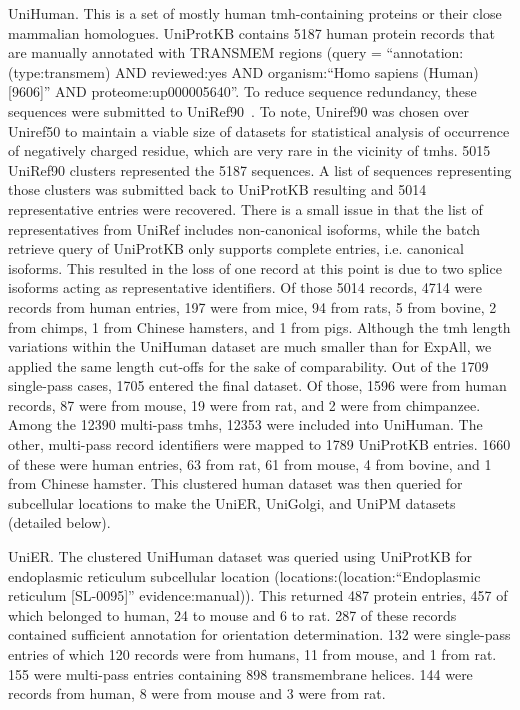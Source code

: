 UniHuman. This is a set of mostly human \gls{tmh}-containing proteins or their close mammalian homologues. UniProtKB contains 5187 human protein records that are manually annotated with TRANSMEM regions (query = ``annotation:(type:transmem) AND reviewed:yes AND organism:``Homo sapiens (Human) [9606]'' AND proteome:up000005640''. To reduce sequence redundancy, these sequences were submitted to UniRef90~\cite{Suzek2015}. To note, Uniref90 was chosen over Uniref50 to maintain a viable size of datasets for statistical analysis of occurrence of negatively charged residue, which are very rare in the vicinity of \gls{tmh}s. 5015 UniRef90 clusters represented the 5187 sequences. A list of sequences representing those clusters was submitted back to UniProtKB resulting and 5014 representative entries were recovered. There is a small issue in that the list of representatives from UniRef includes non-canonical isoforms, while the batch retrieve query of UniProtKB only supports complete entries, i.e. canonical isoforms. This resulted in the loss of one record at this point is due to two splice isoforms acting as representative identifiers. Of those 5014 records, 4714 were records from human entries, 197 were from mice, 94 from rats, 5 from bovine, 2 from chimps, 1 from Chinese hamsters, and 1 from pigs. Although the \gls{tmh} length variations within the UniHuman dataset are much smaller than for ExpAll, we applied the same length cut-offs for the sake of comparability. Out of the 1709 single-pass cases, 1705 entered the final dataset. Of those, 1596 were from human records, 87 were from mouse, 19 were from rat, and 2 were from chimpanzee. Among the 12390 multi-pass \gls{tmh}s, 12353 were included into UniHuman. The other, multi-pass record identifiers were mapped to 1789 UniProtKB entries. 1660 of these were human entries, 63 from rat, 61 from mouse, 4 from bovine, and 1 from Chinese hamster. This clustered human dataset was then queried for subcellular locations to make the UniER, UniGolgi, and UniPM datasets (detailed below).

UniER. The clustered UniHuman dataset was queried using UniProtKB for endoplasmic reticulum subcellular location (locations:(location:``Endoplasmic reticulum [SL-0095]'' evidence:manual)). This returned 487 protein entries, 457 of which belonged to human, 24 to mouse and 6 to rat. 287 of these records contained sufficient annotation for orientation determination. 132 were single-pass entries of which 120 records were from humans, 11 from mouse, and 1 from rat. 155 were multi-pass entries containing 898 transmembrane helices. 144 were records from human, 8 were from mouse and 3 were from rat.

